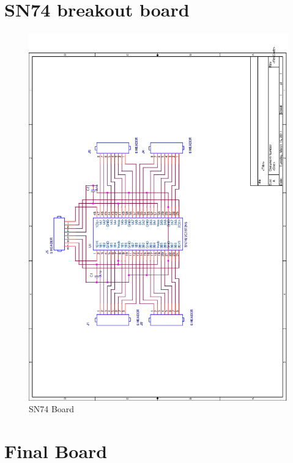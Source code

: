 \documentclass[11pt]{report} %
\begin{document}
	\section{SN74 breakout board}
	\label{SN74_breakout_diagram}
	\begin{figure}[H]
		\centering
		\includegraphics[scale=0.50]{images/sn74.png}
		\caption{SN74 Board}\label{fig:sn74_board}
	\end{figure}
	
	\section{Final Board}
	\label{final_board_diagram}
\end{document}
